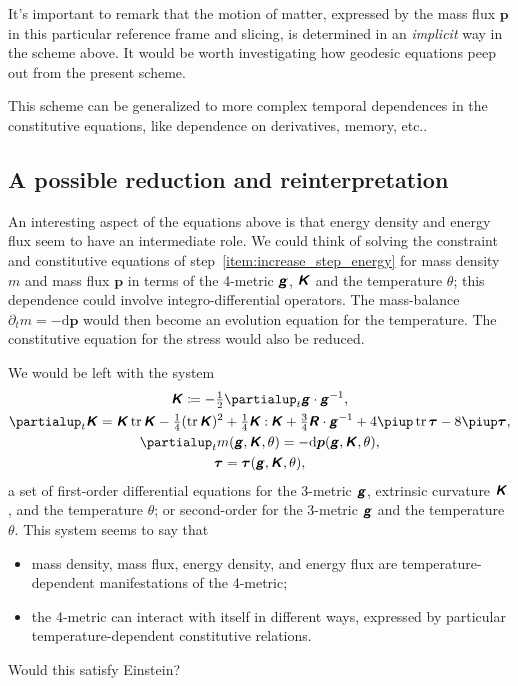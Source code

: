 \documentclass[\ifafour a4paper,12pt,\else a5paper,10pt,\fi%
onecolumn,oneside,article,%
british%
]{memoir}
\theoremstyle{remark}
\theoremstyle{innote}
\newcommand*{\mathte}[1]{\textbf{\textit{\textsf{#1}}}}
\newcommand*{\citep}{\parencites}
\newcommand*{\de}{\partialup}%
\newcommand*{\pu}{\piup}%
\newcommand*{\di}{\mathrm{d}}%
\DeclareMathOperator{\tr}{tr}%
\newcommand*{\defd}{\coloneqq}
\newcommand*{\con}{\mathbin{:}}%
\renewcommand*{\|}{\nonscript\,\vert\nonscript\;\mathopen{}}
\newcommand*{\etc}{{etc.}}
\newcommand*{\ydd}{m}
\newcommand*{\yd}{\ydd}
\newcommand*{\yjj}{p}
\newcommand*{\yj}{\bm{\yjj}}
\newcommand*{\yTT}{\tau}
\newcommand*{\yT}{\bm{\yTT}}
\newcommand*{\ygg}{g}
\newcommand*{\yg}{\mathte{\ygg}}
\newcommand*{\yKK}{K}
\newcommand*{\yK}{\mathte{\yKK}}
\newcommand*{\yRR}{R}
\newcommand*{\yR}{\mathte{\yRR}}
\newcommand*{\yte}{\theta}
\begin{document}
It's important to remark that the motion of matter, expressed by the mass
flux $\yj$ in this particular reference frame and slicing, is determined
in an \emph{implicit} way in the scheme above. It would be worth
investigating how geodesic equations \citep{gerochetal1975,weatherall2011}
peep out from the present scheme.

This scheme can be generalized to more complex temporal dependences in the
constitutive equations, like dependence on derivatives, memory, \etc.

\subsection{A possible reduction and reinterpretation}
\label{sec:reinterpretation_metric_temp}

An interesting aspect of the equations above is that energy density and
energy flux seem to have an intermediate role. We could think of solving
the constraint and constitutive equations of
step~\ref{item:increase_step_energy} for mass density $\yd$ and mass flux
$\yj$ in terms of the 4-metric $\yg$, $\yK$ and the temperature $\yte$;
this dependence could involve integro-differential operators. The
mass-balance $\de_t\yd = -\di\yj$ would then become an evolution equation
for the temperature. The constitutive equation for the stress would also be
reduced.

We would be left with the system
\begin{subequations}\label{eq:evolution_eqns_new}
  \begin{gather}
    \label{eq:dt_metric_new}
    \yK \defd -\tfrac{1}{2}\de_t \yg \cdot \yg^{-1},
    \\
    \label{eq:dt_curvat_new}
    \de_t \yK =  \yK\tr\yK
                - \tfrac{1}{4} (\tr\yK)^2
                +\tfrac{1}{4}\yK\con\yK
                + \tfrac{3}{4}\yR\cdot\yg^{-1} 
                + 4\pu\tr\yT - 8\pu\yT,
    \\
    \label{eq:constit_mass_new}
    \de_t \yd(\yg,\yK,\yte) = -\di\yj(\yg,\yK,\yte),
    \\
    \label{eq:constit_T_new}
    \yT = \yT(\yg,\yK,\yte),
  \end{gather}
\end{subequations}
a set of first-order differential equations for the 3-metric $\yg$,
extrinsic curvature $\yK$, and the temperature $\yte$; or second-order for
the 3-metric $\yg$ and the temperature $\yte$. This system seems to say
that
\begin{itemize}
\item mass density, mass flux, energy density, and energy flux are
  temperature-dependent manifestations of the 4-metric;
\item the 4-metric can interact with itself in different ways, expressed by
  particular temperature-dependent constitutive relations.
\end{itemize}
Would this satisfy Einstein?
\end{document}
